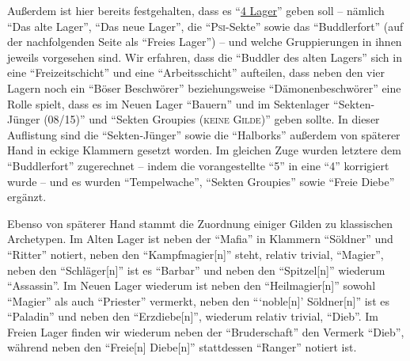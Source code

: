 \documentclass[a5paper,pagesize,numbers=noenddot]{scrbook}
\begin{document}
Außerdem ist hier bereits festgehalten, dass es \enquote{\uline{4 Lager}} geben soll -- nämlich \enquote{Das alte Lager}, \enquote{Das neue Lager}, die \enquote{\textsc{Psi}-Sekte} sowie das \enquote{Buddlerfort} (auf der nachfolgenden Seite als \enquote{Freies Lager}) -- und welche Gruppierungen in ihnen jeweils vorgesehen sind.
Wir erfahren, dass die \enquote{Buddler des alten Lagers} sich in eine \enquote{Freizeitschicht} und eine \enquote{Arbeitsschicht} aufteilen, dass neben den vier Lagern noch ein \enquote{Böser Beschwörer} beziehungsweise \enquote{Dämonenbeschwörer} eine Rolle spielt, dass es im Neuen Lager \enquote{Bauern} und im Sektenlager \enquote{Sekten-Jünger (08/15)} und \enquote{Sekten Groupies (\textsc{keine Gilde})} geben sollte.
In dieser Auflistung sind die \enquote{Sekten-Jünger} sowie die \enquote{Halborks} außerdem von späterer Hand in eckige Klammern gesetzt worden.
Im gleichen Zuge wurden letztere dem \enquote{Buddlerfort} zugerechnet -- indem die vorangestellte \enquote{5} in eine \enquote{4} korrigiert wurde -- und es wurden \enquote{Tempelwache}, \enquote{Sekten Groupies} sowie \enquote{Freie Diebe} ergänzt.

Ebenso von späterer Hand stammt die Zuordnung einiger Gilden zu klassischen Archetypen.
Im Alten Lager ist neben der \enquote{Mafia} in Klammern \enquote{Söldner} und \enquote{Ritter} notiert, neben den \enquote{Kampfmagier[n]} steht, relativ trivial, \enquote{Magier}, neben den \enquote{Schläger[n]} ist es \enquote{Barbar} und neben den \enquote{Spitzel[n]} wiederum \enquote{Assassin}.
Im Neuen Lager wiederum ist neben den \enquote{Heilmagier[n]} sowohl \enquote{Magier} als auch \enquote{Priester} vermerkt, neben den \enquote{\enquote{noble[n]} Söldner[n]} ist es \enquote{Paladin} und neben den \enquote{Erzdiebe[n]}, wiederum relativ trivial, \enquote{Dieb}.
Im Freien Lager finden wir wiederum neben der \enquote{Bruderschaft} den Vermerk \enquote{Dieb}, während neben den \enquote{Freie[n] Diebe[n]} stattdessen \enquote{Ranger} notiert ist.
\end{document}
